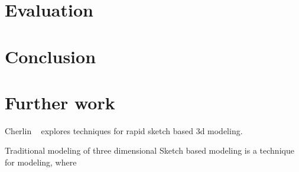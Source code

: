 \documentclass[a4paper,10pt]{article}
\begin{document}
\section{Evaluation}

\section{Conclusion}

\section{Further work}


Cherlin ~\cite{Cherlin:2005:SMF:1090122.1090145} explores techniques for rapid sketch based 3d modeling.

Traditional modeling of three dimensional 
Sketch based modeling is a technique for modeling, where 

{}

\end{document}
